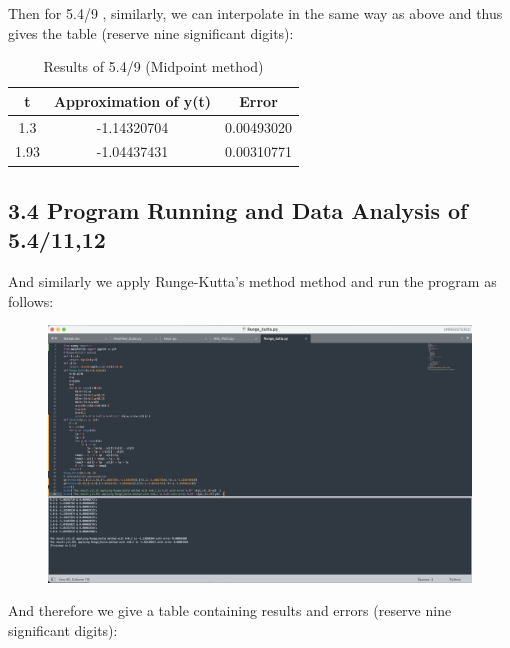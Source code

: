 \documentclass{article}
\begin{document}
    Then for  5.4/9 , similarly, we can interpolate in the same way as above and thus gives the table (reserve nine significant digits):
    \begin{table}[htbp]
    \centering
    \caption{Results of 5.4/9 (Midpoint method)}
    \begin{tabular}{c|c|c}
    \toprule
    t& \textbf{Approximation of y(t)} & \textbf{Error} \\ 
    \midrule
    1.3 & -1.14320704 & 0.00493020 \\
    1.93 & -1.04437431 & 0.00310771 \\
    \bottomrule
    \end{tabular}
    \end{table}

\newpage
\subsection{3.4 Program Running and Data Analysis of 5.4/11,12} 
    And similarly we apply Runge-Kutta's method method and run the program as follows:

    \begin{figure}[h]
    \centering
    \includegraphics[scale=0.22]{Program4}
    \end{figure}

    And therefore we give a table containing results and errors (reserve nine significant digits): 
\end{document}
